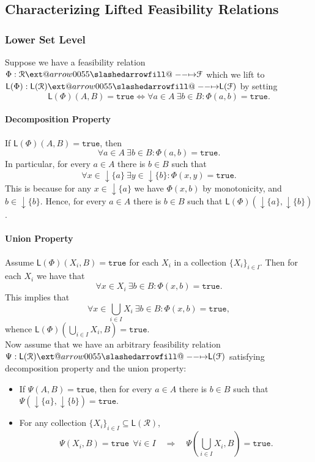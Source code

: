 \documentclass[12pt]{article}
\makeatletter
\theoremstyle{definition}
\theoremstyle{plain}
\theoremstyle{plain}
\theoremstyle{plain}
\theoremstyle{plain}
\theoremstyle{remark}
\theoremstyle{remark}
\newcommand{\mc}[1]{\mathcal{#1}}
\newcommand{\sub}{\subseteq}
\newcommand{\low}{\mathsf{L}}
\newcommand{\true}{\mathtt{true}}
\newcommand{\lwc}[1]{{\downarrow #1}}
\def\slashedarrowfill@#1#2#3#4#5{%
	$\m@th\thickmuskip0mu\medmuskip\thickmuskip\thinmuskip\thickmuskip
	\relax#5#1\mkern-7mu%
	\cleaders\hbox{$#5\mkern-2mu#2\mkern-2mu$}\hfill
	\mathclap{#3}\mathclap{#2}%
	\cleaders\hbox{$#5\mkern-2mu#2\mkern-2mu$}\hfill
	\mkern-7mu#4$%
}
\def\rightslashedarrowfill@{%
	\slashedarrowfill@\relbar\relbar\mapstochar\rightarrow}
\newcommand\xslashedrightarrow[2][]{%
	\ext@arrow 0055{\rightslashedarrowfill@}{#1}{#2}}
\makeatother
\begin{document}
\subsection{Characterizing Lifted Feasibility Relations}

\subsubsection{Lower Set Level}
Suppose we have a feasibility relation $\Phi: \mc{R} \xslashedrightarrow{} \mc{F}$ which we lift to $\low(\Phi): \low(\mc{R}) \xslashedrightarrow{} \low(\mc{F})$ by setting 
$$\low(\Phi)(A,B) = \true \iff \forall a \in A \: \exists b \in B: \Phi(a,b)=\true.$$

\paragraph{Decomposition Property} If $\low(\Phi)(A,B) = \true$, then 
$$\forall a \in A \: \exists b \in B: \Phi(a,b)=\true.$$
In particular, for every $a \in A$ there is $b \in B$ such that
$$\forall x \in \lwc{\{a\}} \: \exists y \in \lwc{\{b\}}: \Phi(x,y)=\true.$$
This is because for any $x \in \lwc{\{a\}}$ we have $\Phi(x,b)$ by monotonicity, and $b \in \lwc{\{b\}}$. Hence, for every $a \in A$ there is $b \in B$ such that $\low(\Phi)(\lwc{\{a\}},\lwc{\{b\}})$. 

\paragraph{Union Property} Assume $\low(\Phi)(X_i,B) = \true$ for each $X_i$ in a collection $\{X_i\}_{i \in I}$. Then for each $X_i$ we have that $$\forall x \in X_i \: \exists b \in B: \Phi(x,b)=\true.$$ This implies that
$$\forall x \in \bigcup_{i \in I}X_i \: \exists b \in B: \Phi(x,b)=\true, $$ whence
$\low(\Phi)(\bigcup_{i \in I}X_i,B) = \true$. \\

Now assume that we have an arbitrary feasibility relation $\Psi: \low(\mc{R}) \xslashedrightarrow{} \low(\mc{F})$ satisfying decomposition property and the union property: 
\begin{itemize}
	\item If $\Psi(A,B)=\true$, then for every $a \in A$ there is $b \in B$ such that $\Psi(\lwc{\{a\}},\lwc{\{b\}})=\true$.
	\item For any collection $\{X_i\}_{i \in I} \sub \low(\mc{R})$,
	$$\Psi(X_i,B) = \true \:\: \forall i \in I \quad \Rightarrow \quad \Psi(\bigcup_{i \in I} X_i,B) = \true.$$
\end{itemize}
\end{document}
